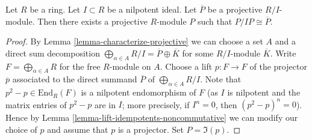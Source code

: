 \begin{lemma}
\label{lemma-lift-projective-module}
Let $R$ be a ring. Let $I \subset R$ be a nilpotent ideal. Let
$\overline{P}$ be a projective $R/I$-module. Then there exists a
projective $R$-module $P$ such that $P/IP \cong \overline{P}$.
\end{lemma}

\begin{proof}
By Lemma \ref{lemma-characterize-projective}
we can choose a set $A$ and a direct sum decomposition
$\bigoplus_{\alpha \in A} R/I = \overline{P} \oplus \overline{K}$
for some $R/I$-module $\overline{K}$. Write $F = \bigoplus_{\alpha \in A} R$
for the free $R$-module on $A$. Choose a lift
$p : F \to F$ of the projector $\overline{p}$ associated to
the direct summand $\overline{P}$ of $\bigoplus_{\alpha \in A} R/I$.
Note that $p^2 - p \in \text{End}_R(F)$ is a nilpotent
endomorphism of $F$ (as $I$ is nilpotent and the matrix entries of
$p^2 - p$ are in $I$; more precisely, if $I^n = 0$, then $(p^2 - p)^n = 0$).
Hence by Lemma \ref{lemma-lift-idempotents-noncommutative}
we can modify our choice of $p$ and assume that $p$ is a projector.
Set $P = \Im(p)$.
\end{proof}
